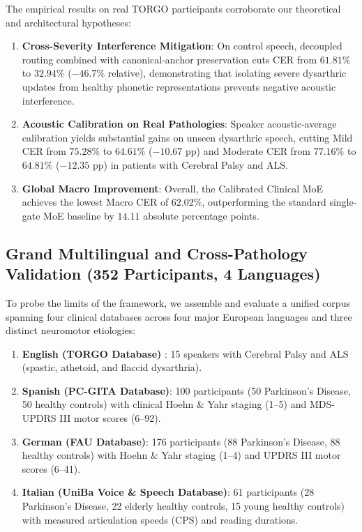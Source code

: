 \documentclass[10pt,twocolumn]{article}
\begin{document}
The empirical results on real TORGO participants corroborate our theoretical and architectural hypotheses:
\begin{enumerate}
    \item \textbf{Cross-Severity Interference Mitigation}: On control speech, decoupled routing combined with canonical-anchor preservation cuts CER from $61.81\%$ to $\mathbf{32.94\%}$ ($-46.7\%$ relative), demonstrating that isolating severe dysarthric updates from healthy phonetic representations prevents negative acoustic interference.
    \item \textbf{Acoustic Calibration on Real Pathologies}: Speaker acoustic-average calibration yields substantial gains on unseen dysarthric speech, cutting Mild CER from $75.28\%$ to $\mathbf{64.61\%}$ ($-10.67$ pp) and Moderate CER from $77.16\%$ to $\mathbf{64.81\%}$ ($-12.35$ pp) in patients with Cerebral Palsy and ALS.
    \item \textbf{Global Macro Improvement}: Overall, the Calibrated Clinical MoE achieves the lowest Macro CER of $\mathbf{62.02\%}$, outperforming the standard single-gate MoE baseline by $14.11$ absolute percentage points.
\end{enumerate}

\subsection{Grand Multilingual and Cross-Pathology Validation (352 Participants, 4 Languages)}

To probe the limits of the framework, we assemble and evaluate a unified corpus spanning four clinical databases across four major European languages and three distinct neuromotor etiologies:

\begin{enumerate}
    \item \textbf{English (TORGO Database)} \cite{rudzicz2012torgo}: 15 speakers with Cerebral Palsy and ALS (spastic, athetoid, and flaccid dysarthria).
    \item \textbf{Spanish (PC-GITA Database)}: 100 participants (50 Parkinson's Disease, 50 healthy controls) with clinical Hoehn \& Yahr staging (1--5) and MDS-UPDRS III motor scores (6--92).
    \item \textbf{German (FAU Database)}: 176 participants (88 Parkinson's Disease, 88 healthy controls) with Hoehn \& Yahr staging (1--4) and UPDRS III motor scores (6--41).
    \item \textbf{Italian (UniBa Voice \& Speech Database)}: 61 participants (28 Parkinson's Disease, 22 elderly healthy controls, 15 young healthy controls) with measured articulation speeds (CPS) and reading durations.
\end{enumerate}
\end{document}
